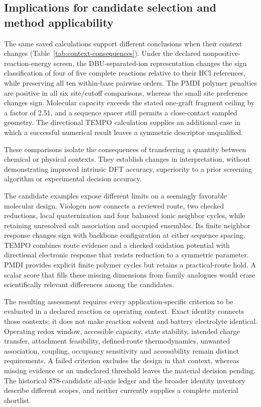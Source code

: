 \documentclass[11pt]{article}
\begin{document}
\subsection{Implications for candidate selection and method applicability}
The same saved calculations support different conclusions when their context changes (Table~\ref{tab:context-consequences}). Under the declared nonpositive-reaction-energy screen, the DBU-separated-ion representation changes the sign classification of four of five complete reactions relative to their HCl references, while preserving all ten within-base pairwise orders. The PMDI polymer penalties are positive in all six site/cutoff comparisons, whereas the small site preference changes sign. Molecular capacity exceeds the stated one-graft fragment ceiling by a factor of 2.51, and a sequence spacer still permits a close-contact sampled geometry. The directional TEMPO calculation supplies an additional case in which a successful numerical result leaves a symmetric descriptor unqualified.

These comparisons isolate the consequences of transferring a quantity between chemical or physical contexts. They establish changes in interpretation, without demonstrating improved intrinsic DFT accuracy, superiority to a prior screening algorithm or experimental decision accuracy.



The candidate examples expose different limits on a seemingly favorable molecular design. Viologen now connects a reviewed route, two checked reductions, local quaternization and four balanced ionic neighbor cycles, while retaining unresolved salt association and occupied ensembles. Its finite neighbor response changes sign with backbone configuration at either sequence spacing. TEMPO combines route evidence and a checked oxidation potential with directional electronic response that resists reduction to a symmetric parameter. PMDI provides explicit finite polymer cycles but retains a practical-route hold. A scalar score that fills these missing dimensions from family analogues would erase scientifically relevant differences among the candidates.

The resulting assessment requires every application-specific criterion to be evaluated in a declared reaction or operating context. Exact identity connects those contexts; it does not make reaction solvent and battery electrolyte identical. Operating redox window, accessible capacity, state stability, intended charge transfer, attachment feasibility, defined-route thermodynamics, unwanted association, coupling, occupancy sensitivity and accessibility remain distinct requirements. A failed criterion excludes the design in that context, whereas missing evidence or an undeclared threshold leaves the material decision pending. The historical 878-candidate all-axis ledger and the broader identity inventory describe different scopes, and neither currently supplies a complete material shortlist.
\end{document}
